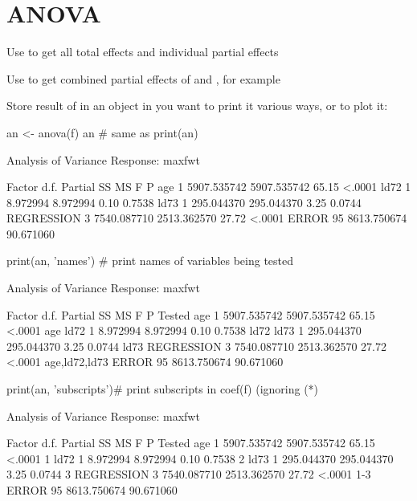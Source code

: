 \section{ANOVA}
\bi
\item Use  to get all total effects and
  individual partial effects
\item Use  to get combined partial effects of
   and , for example
\item Store result of  in an object in you want to print it
  various ways, or to plot it:
\begin{Schunk}
\begin{Sinput}
an <- anova(f)
an                     # same as print(an)
\end{Sinput}
\begin{Soutput}
                Analysis of Variance          Response: maxfwt 

 Factor     d.f. Partial SS  MS          F     P     
 age         1   5907.535742 5907.535742 65.15 <.0001
 ld72        1      8.972994    8.972994  0.10 0.7538
 ld73        1    295.044370  295.044370  3.25 0.0744
 REGRESSION  3   7540.087710 2513.362570 27.72 <.0001
 ERROR      95   8613.750674   90.671060             
\end{Soutput}
\begin{Sinput}
print(an, 'names')     # print names of variables being tested
\end{Sinput}
\begin{Soutput}
                Analysis of Variance          Response: maxfwt 

 Factor     d.f. Partial SS  MS          F     P      Tested       
 age         1   5907.535742 5907.535742 65.15 <.0001 age          
 ld72        1      8.972994    8.972994  0.10 0.7538 ld72         
 ld73        1    295.044370  295.044370  3.25 0.0744 ld73         
 REGRESSION  3   7540.087710 2513.362570 27.72 <.0001 age,ld72,ld73
 ERROR      95   8613.750674   90.671060                           
\end{Soutput}
\begin{Sinput}
print(an, 'subscripts')# print subscripts in coef(f) (ignoring (*\ipacue*)
\end{Sinput}
\begin{Soutput}
                Analysis of Variance          Response: maxfwt 

 Factor     d.f. Partial SS  MS          F     P      Tested
 age         1   5907.535742 5907.535742 65.15 <.0001 1     
 ld72        1      8.972994    8.972994  0.10 0.7538 2     
 ld73        1    295.044370  295.044370  3.25 0.0744 3     
 REGRESSION  3   7540.087710 2513.362570 27.72 <.0001 1-3   
 ERROR      95   8613.750674   90.671060                    


\end{Soutput}
\end{Schunk}
